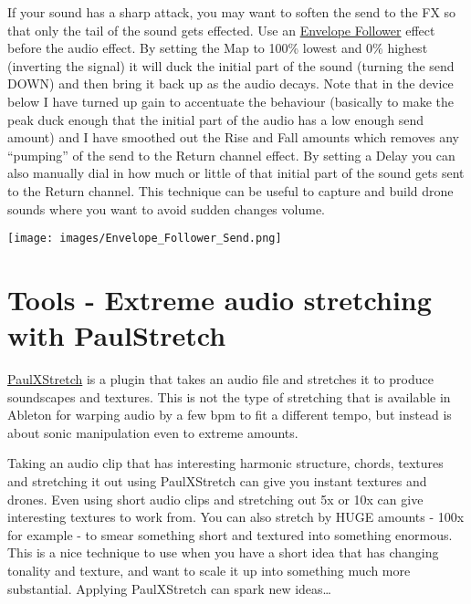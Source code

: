 \documentclass[
  12pt,
  letterpaper,
  oneside,
  open=any]{scrbook}
\begin{document}
If your sound has a sharp attack, you may want to soften the send to the
FX so that only the tail of the sound gets effected. Use an
\href{https://www.ableton.com/en/live-manual/11/max-for-live-devices/\#envelope-follower}{Envelope
Follower} effect before the audio effect. By setting the Map to 100\%
lowest and 0\% highest (inverting the signal) it will duck the initial
part of the sound (turning the send DOWN) and then bring it back up as
the audio decays. Note that in the device below I have turned up gain to
accentuate the behaviour (basically to make the peak duck enough that
the initial part of the audio has a low enough send amount) and I have
smoothed out the Rise and Fall amounts which removes any ``pumping'' of
the send to the Return channel effect. By setting a Delay you can also
manually dial in how much or little of that initial part of the sound
gets sent to the Return channel. This technique can be useful to capture
and build drone sounds where you want to avoid sudden changes volume.

\texttt{[image: images/Envelope\_Follower\_Send.png]}


\chapter{Tools - Extreme audio stretching with
PaulStretch}\label{Chapter-016-Tools-PaulStretch}

\href{https://sonosaurus.com/paulxstretch/}{PaulXStretch} is a plugin
that takes an audio file and stretches it to produce soundscapes and
textures. This is not the type of stretching that is available in
Ableton for warping audio by a few bpm to fit a different tempo, but
instead is about sonic manipulation even to extreme amounts.

\begin{tcolorbox}[enhanced jigsaw, colback=white, rightrule=.15mm, toprule=.15mm, arc=.35mm, opacitybacktitle=0.6, coltitle=black, leftrule=.75mm, bottomtitle=1mm, toptitle=1mm, left=2mm, bottomrule=.15mm, titlerule=0mm, colbacktitle=quarto-callout-tip-color!10!white, colframe=quarto-callout-tip-color-frame, title=\textcolor{quarto-callout-tip-color}{\faLightbulb}\hspace{0.5em}{Key idea}, breakable, opacityback=0]

Taking an audio clip that has interesting harmonic structure, chords,
textures and stretching it out using PaulXStretch can give you instant
textures and drones. Even using short audio clips and stretching out 5x
or 10x can give interesting textures to work from. You can also stretch
by HUGE amounts - 100x for example - to smear something short and
textured into something enormous. This is a nice technique to use when
you have a short idea that has changing tonality and texture, and want
to scale it up into something much more substantial. Applying
PaulXStretch can spark new ideas\ldots{}

\end{tcolorbox}
\end{document}
